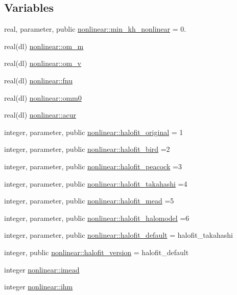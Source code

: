 \subsection*{Variables}
\begin{DoxyCompactItemize}
\item 
real, parameter, public \mbox{\hyperlink{namespacenonlinear_a432119e2fd5a90bc8447a4f87c530660}{nonlinear\+::min\+\_\+kh\+\_\+nonlinear}} = 0.
\item 
real(dl) \mbox{\hyperlink{namespacenonlinear_aabc1c1c2e5484d59aa19897c2312d66e}{nonlinear\+::om\+\_\+m}}
\item 
real(dl) \mbox{\hyperlink{namespacenonlinear_a5fffe9648c0924743701abc9674d3472}{nonlinear\+::om\+\_\+v}}
\item 
real(dl) \mbox{\hyperlink{namespacenonlinear_a41cbc8f2a7d3a4a7133a330e7a96f32f}{nonlinear\+::fnu}}
\item 
real(dl) \mbox{\hyperlink{namespacenonlinear_a95578ad235632d8fd2cc109867cdf329}{nonlinear\+::omm0}}
\item 
real(dl) \mbox{\hyperlink{namespacenonlinear_a340583ce0b342fc665e8dac4abd41d30}{nonlinear\+::acur}}
\item 
integer, parameter, public \mbox{\hyperlink{namespacenonlinear_a7df6fbf986bfffb1410f611a9d9da8d8}{nonlinear\+::halofit\+\_\+original}} = 1
\item 
integer, parameter, public \mbox{\hyperlink{namespacenonlinear_a60a8667a6b76aac6cb917e86e5e813bf}{nonlinear\+::halofit\+\_\+bird}} =2
\item 
integer, parameter, public \mbox{\hyperlink{namespacenonlinear_af6d944f360abde474ac917e61cc9a10a}{nonlinear\+::halofit\+\_\+peacock}} =3
\item 
integer, parameter, public \mbox{\hyperlink{namespacenonlinear_aac3355efc27ec1212dfc7d494c94b8bd}{nonlinear\+::halofit\+\_\+takahashi}} =4
\item 
integer, parameter, public \mbox{\hyperlink{namespacenonlinear_a321ebd41ef62b8c5f49c902695c97100}{nonlinear\+::halofit\+\_\+mead}} =5
\item 
integer, parameter, public \mbox{\hyperlink{namespacenonlinear_ac93879b4e408404c04347ff8ba8e170c}{nonlinear\+::halofit\+\_\+halomodel}} =6
\item 
integer, parameter, public \mbox{\hyperlink{namespacenonlinear_a17d0a06b4737dd11deb01679dd462d0d}{nonlinear\+::halofit\+\_\+default}} = halofit\+\_\+takahashi
\item 
integer, public \mbox{\hyperlink{namespacenonlinear_a1f7f92360f1ca05ad5bc378c6f48c4e2}{nonlinear\+::halofit\+\_\+version}} = halofit\+\_\+default
\item 
integer \mbox{\hyperlink{namespacenonlinear_a4a5afbc21c01819b53e73cca3ae9c9db}{nonlinear\+::imead}}
\item 
integer \mbox{\hyperlink{namespacenonlinear_aaffe0db71a291d9ca3d9e8315757f6c0}{nonlinear\+::ihm}}
\end{DoxyCompactItemize}


